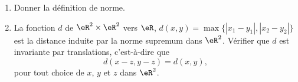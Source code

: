 \begin{exercice}\label{exocontrolecontinu0011}

  \begin{enumerate}
  \item Donner la définition de norme. 
  \item La fonction $d$ de $\eR^2\times\eR^2$ vers $\eR$,  $d(x,y)= \max \{|x_1-y_1|, |x_2-y_2|\}$ est la distance induite par la norme supremum dans $\eR^2$. Vérifier que $d$ est invariante par translations, c'est-à-dire que 
\[
d(x-z,y-z)=d(x,y), 
\]
pour tout choice de $x$, $y$ et  $z$ dans $\eR^2$.
  \end{enumerate}

  
\end{exercice}

